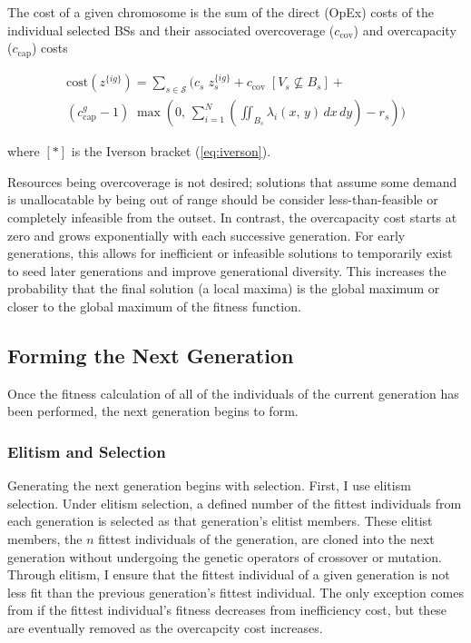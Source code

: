 \documentclass[12pt,dvipsnames]{report}
\begin{document}
The cost of a given chromosome is the sum of the direct (OpEx) costs of the individual selected BSs and their associated overcoverage ($c_{\text{cov}}$) and overcapacity ($c_{\text{cap}}$) costs

\begin{multline} \label{eq:GACost}
\text{cost}\left(z^{\{ig\}}\right) = \sum_{s \in \mathcal{S}} \Biggl( c_s \; z_s^{\{ig\}} + c_\text{cov} \; \left[ V_s \not\subseteq B_s \right] + \\ \left(c_\text{cap}^g - 1\right) \; \max\left( 0,\, \sum_{i = 1}^N \left( \iint_{B_s} \lambda_i\left(x,\, y\right)\, dx\, dy \right) - r_s \right) \Biggr)
\end{multline}

\noindent where $\left[ * \right]$ is the Iverson bracket (\cref{eq:iverson}).

Resources being overcoverage is not desired; solutions that assume some demand is unallocatable by being out of range should be consider less-than-feasible or completely infeasible from the outset.  In contrast, the overcapacity cost starts at zero and grows exponentially with each successive generation.  For early generations, this allows for inefficient or infeasible solutions to temporarily exist to seed later generations and improve generational diversity.  This increases the probability that the final solution (a local maxima) is the global maximum or closer to the global maximum of the fitness function.

\subsection{Forming the Next Generation} \label{subsec:ga_next}

Once the fitness calculation of all of the individuals of the current generation has been performed, the next generation begins to form.

\subsubsection{Elitism and Selection}

Generating the next generation begins with selection.  First, I use elitism selection.  Under elitism selection, a defined number of the fittest individuals from each generation is selected as that generation's elitist members.  These elitist members, the $n$ fittest individuals of the generation, are cloned into the next generation without undergoing the genetic operators of crossover or mutation.  Through elitism, I ensure that the fittest individual of a given generation is not less fit than the previous generation's fittest individual.  The only exception comes from if the fittest individual's fitness decreases from inefficiency cost, but these are eventually removed as the overcapcity cost increases.
\end{document}
